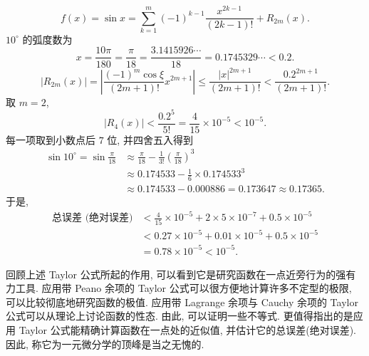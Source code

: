 \begin{solution}
\[
f(x)=\sin x=\sum_{k=1}^{m}(-1)^{k-1}\frac{x^{2k-1}}{(2k-1)!}+R_{2m}(x).
\]
$10^\circ$ 的弧度数为
\[
x=\frac{10\pi}{180}=\frac{\pi}{18}=\frac{3.1415926\cdots}{18}=0.1745329\cdots<0.2.
\]
\[
|R_{2m}(x)|=\left|\frac{(-1)^{m}\cos\xi}{(2m+1)!}x^{2m+1}\right|\leqslant\frac{|x|^{2m+1}}{(2m+1)!}<\frac{0.2^{2m+1}}{(2m+1)!}.
\]
取 $m=2$,
\[
|R_{4}(x)|<\frac{0.2^{5}}{5!}=\frac{4}{15}\times 10^{-5}<10^{-5}.
\]
每一项取到小数点后 $7$ 位, 并四舍五入得到
\begin{align*}
\sin 10^\circ=\sin\frac{\pi}{18}
&\approx \frac{\pi}{18}-\frac{1}{3!}\left(\frac{\pi}{18}\right)^{3} \\
&\approx 0.174533-\frac{1}{6}\times 0.174533^{3} \\
&\approx 0.174533-0.000886 = 0.173647 \approx 0.17365.
\end{align*}
于是,
\begin{align*}
\text{总误差 (绝对误差)}
&< \frac{4}{15}\times 10^{-5}+2\times 5\times 10^{-7}+0.5\times 10^{-5} \\
&< 0.27\times 10^{-5}+0.01\times 10^{-5}+0.5\times 10^{-5} \\
&= 0.78\times 10^{-5}<10^{-5}.
\end{align*}
\end{solution}

回顾上述 Taylor 公式所起的作用, 可以看到它是研究函数在一点近旁行为的强有力工具. 应用带 Peano 余项的 Taylor 公式可以很方便地计算许多不定型的极限, 可以比较彻底地研究函数的极值. 应用带 Lagrange 余项与 Cauchy 余项的 Taylor 公式可以从理论上讨论函数的性态. 由此, 可以证明一些不等式. 更值得指出的是应用 Taylor 公式能精确计算函数在一点处的近似值, 并估计它的总误差(绝对误差). 因此, 称它为一元微分学的顶峰是当之无愧的.

